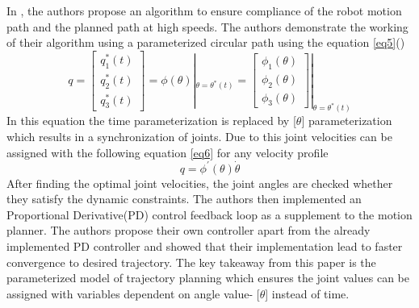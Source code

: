 In \citet{Pchelkin2013}, the authors propose an algorithm to ensure compliance of the robot motion path and the planned path at high speeds. The authors demonstrate the working of their algorithm using a parameterized circular path using the equation \eqref{eq5}(\citet{Pchelkin2013})
\begin{equation}
\label{eq5}
q= \begin{bmatrix} q_{1}^{*}(t)\\ q_{2}^{*}(t)\\ q_{3}^{*}(t) \end{bmatrix} = \phi (\theta)|_{\theta=\theta^{*}(t)} = \begin{bmatrix} \phi_{1}(\theta)\\ \phi_{2}(\theta)\\ \phi_{3}(\theta) \end{bmatrix}|_{\theta=\theta^{*}(t)}
\end{equation}
In this equation the time parameterization is replaced by [$\theta$] parameterization which results in a synchronization of joints. Due to this joint velocities can be assigned with the following equation \eqref{eq6} for any velocity profile
\begin{equation}
\label{eq6}
q=\phi^{'}(\theta)\dot{\theta}
\end{equation}
After finding the optimal joint velocities, the joint angles are checked whether they satisfy the dynamic constraints. The authors then implemented an Proportional Derivative(PD) control feedback loop as a supplement to the motion planner. The authors propose their own controller apart from the already implemented PD controller and showed that their implementation lead to faster convergence to desired trajectory. The key takeaway from this paper is the parameterized model of trajectory planning which ensures the joint values can be assigned with variables dependent on angle value- [$\theta$] instead of time. 
